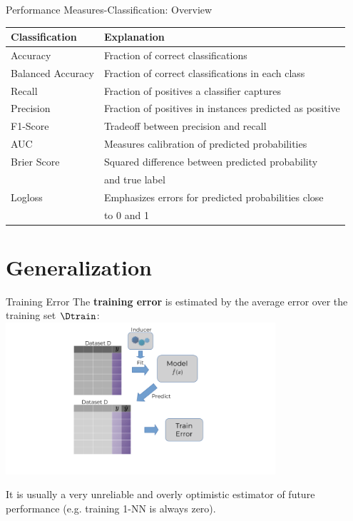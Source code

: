 \begin{frame}{Performance Measures-Classification: Overview}
\small
\begin{table}[]
\begin{tabular}{ll}
\hline
\textbf{Classification}& \textbf{Explanation}  \\ \hline
Accuracy              &  Fraction of correct classifications                             \\ \hline
Balanced Accuracy     &  Fraction of correct classifications in each class               \\ \hline
Recall                &  Fraction of positives a classifier captures                     \\ \hline
Precision             &  Fraction of positives in instances predicted as positive        \\ \hline 
F1-Score              &  Tradeoff between precision and recall                           \\ \hline
AUC                   &  Measures calibration of predicted probabilities                 \\ \hline
Brier Score           &  Squared difference between predicted probability                \\ 
                      & and true label                                                   \\ \hline
Logloss               &  Emphasizes errors for predicted probabilities close             \\ 
                      & to 0 and 1                                                       \\ \hline
\end{tabular}
\end{table}
\normalsize

\end{frame}


\section{Generalization}


\begin{frame}{Training Error}
The \textbf{training error} 
is estimated by the average error over the training set
\(\Dtrain\):
\includegraphics[width=10cm,page=4]{plots/train_error.png}

It is usually a very unreliable and overly optimistic estimator of future performance (e.g. training 1-NN is always zero).
\end{frame}


